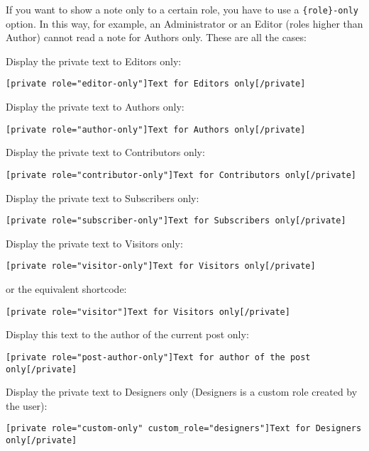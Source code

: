 If you want to show a note only to a certain role, you have to use a
\verb+{role}-only+ option. In this way, for example, an Administrator or an
Editor (roles higher than Author) cannot read a note for Authors only. These are
all the cases:

Display the private text to Editors only:

\begin{lstlisting}
[private role="editor-only"]Text for Editors only[/private]
\end{lstlisting}

Display the private text to Authors only:

\begin{lstlisting}
[private role="author-only"]Text for Authors only[/private]
\end{lstlisting}

Display the private text to Contributors only:

\begin{lstlisting}
[private role="contributor-only"]Text for Contributors only[/private]
\end{lstlisting}

Display the private text to Subscribers only:

\begin{lstlisting}
[private role="subscriber-only"]Text for Subscribers only[/private]
\end{lstlisting}

Display the private text to Visitors only:

\begin{lstlisting}
[private role="visitor-only"]Text for Visitors only[/private]
\end{lstlisting}

\noindent or the equivalent shortcode:

\begin{lstlisting}
[private role="visitor"]Text for Visitors only[/private]
\end{lstlisting}

Display this text to the author of the current post only:

\begin{lstlisting}
[private role="post-author-only"]Text for author of the post only[/private]
\end{lstlisting}

Display the private text to Designers only (Designers is a custom role created
by the user):

\begin{lstlisting}
[private role="custom-only" custom_role="designers"]Text for Designers only[/private]
\end{lstlisting}

